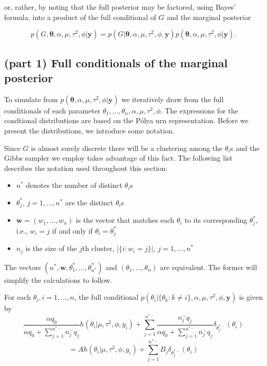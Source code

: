 \documentclass[12pt]{article}
\newcommand{\m}[1]{\mathbf{\bm{#1}}}
\begin{document}
\noindent or, rather, by noting that the full posterior may be factored, using Bayes' formula, into a product of the full conditional of $G$ and the marginal posterior

\[ p(G,\m{\theta},\alpha,\mu,\tau^2,\phi|\m{y}) = p(G|\m{\theta},\alpha,\mu,\tau^2,\phi,\m{y})p(\m{\theta},\alpha,\mu,\tau^2,\phi|\m{y}). \]

\subsection*{(part 1) Full conditionals of the marginal posterior}

\noindent To simulate from $p(\m{\theta},\alpha,\mu,\tau^2,\phi|\m{y})$ we iteratively draw from the full conditionals of each parameter $\theta_1,\ldots,\theta_n,\alpha,\mu,\tau^2,\phi$. The expressions for the condtional distributions are based on the P{\'o}lya urn representation. Before we present the distributions, we introduce some notation.

Since $G$ is almost surely discrete there will be a clustering among the $\theta_i$s and the Gibbs sampler we employ takes advantage of this fact. The following list describes the notation used throughout this section:
\begin{itemize}[label=$\cdot$]
\item $n^*$ denotes the number of distinct $\theta_i$s
\item $\theta_j^*$, $j=1,\ldots,n^*$ are the distinct $\theta_i$s
\item $\m{w}=(w_1,\ldots,w_n)$ is the vector that matches each $\theta_i$ to its corresponding $\theta_j^*$, i.e., $w_i=j$ if and only if $\theta_i=\theta_j^*$
\item $n_j$ is the size of the $j$th cluster, $|\{i:w_i=j\}|$, $j=1,\ldots,n^*$
\end{itemize}

\noindent The vectors $(n^*, \m{w}, \theta_1^*,\ldots,\theta_{n^*}^*)$ and $(\theta_1,\ldots,\theta_n)$ are equivalent. The former will simplify the calculations to follow.

For each $\theta_i, i=1,\ldots,n$, the full conditional $p(\theta_i|\{\theta_k:k\neq i\},\alpha,\mu,\tau^2,\phi,\m{y})$ is given by
\[ \frac{\alpha q_0}{\alpha q_0 + \sum_{j=1}^{n^{*-}} n_j^-q_j}h(\theta_i|\mu,\tau^2,\phi,y_i)+\sum_{j=1}^{n^{*-}}\frac{n_j^-q_j}{\alpha q_0 + \sum_{j=1}^{n^{*-}}n_j^-q_j}\delta_{\theta_j^{*-}}(\theta_i) \]
\[ =Ah(\theta_i|\mu,\tau^2,\phi,y_i)+\sum_{j=1}^{n^{*-}}B_j \delta_{\theta_j^{*-}}(\theta_i) \]
\end{document}
